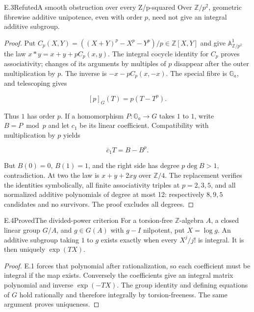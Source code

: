 \begin{statement}{E.3}{Refuted}{A smooth obstruction over every Z/p-squared}
Over $\mathbb Z/p^2$, geometric fibrewise additive
unipotence, even with order $p$, need not give an
integral additive subgroup.
\end{statement}
\begin{proof}
Put $C_p(X,Y)=((X+Y)^p-X^p-Y^p)/p\in\mathbb Z[X,Y]$
and give $\mathbb A^1_{\mathbb Z/p^2}$ the law
$x*y=x+y+pC_p(x,y)$.
The integral cocycle identity for $C_p$ proves associativity;
changes of its arguments by multiples of $p$ disappear
after the outer multiplication by $p$.
The inverse is $-x-pC_p(x,-x)$.
The special fibre is $\mathbb G_a$, and telescoping gives

$$
[p]_G(T)=p(T-T^p).
$$

Thus $1$ has order $p$.
If a homomorphism $P:\mathbb G_a\to G$ takes $1$ to $1$,
write $B=P\bmod p$ and let $c_1$ be its linear coefficient.
Compatibility with multiplication by $p$ yields

$$
\bar c_1T=B-B^p.
$$

But $B(0)=0$, $B(1)=1$, and the right side has degree
$p\deg B>1$, contradiction.
At two the law is $x+y+2xy$ over $\mathbb Z/4$.
The replacement verifies the identities symbolically,
all finite associativity triples at $p=2,3,5$, and
all normalized additive polynomials of degree at most
12: respectively $8,9,5$ candidates and no survivors.
The proof excludes all degrees.
\end{proof}

\begin{statement}{E.4}{Proved}{The divided-power criterion}
For a torsion-free $\mathbb Z$-algebra $A$, a closed linear
group $G/A$, and $g\in G(A)$ with $g-I$ nilpotent,
put $X=\log g$. An additive subgroup taking $1$ to $g$
exists exactly when every $X^j/j!$ is integral.
It is then uniquely $\exp(TX)$.
\end{statement}
\begin{proof}
E.1 forces that polynomial after rationalization,
so each coefficient must be integral if the map exists.
Conversely the coefficients give an integral matrix
polynomial and inverse $\exp(-TX)$.
The group identity and defining equations of $G$ hold
rationally and therefore integrally by torsion-freeness.
The same argument proves uniqueness.
\end{proof}

